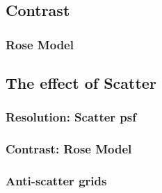 \documentclass[mphy386-notes.tex]{subfiles}
\begin{document}
\subsection{Contrast}
\subsubsection{Rose Model}
\subsection{The effect of Scatter}
\subsubsection{Resolution: Scatter psf}
\subsubsection{Contrast: Rose Model}
\subsubsection{Anti-scatter grids}

\pagebreak
\end{document}
